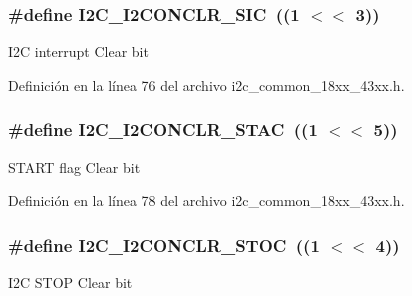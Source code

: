 \subsubsection[{\texorpdfstring{I2\+C\+\_\+\+I2\+C\+O\+N\+C\+L\+R\+\_\+\+S\+IC}{I2C_I2CONCLR_SIC}}]{\setlength{\rightskip}{0pt plus 5cm}\#define I2\+C\+\_\+\+I2\+C\+O\+N\+C\+L\+R\+\_\+\+S\+IC~((1 $<$$<$ 3))}\hypertarget{group___i2_c__18_x_x__43_x_x_ga36753112210a8c33d566b572b63b753b}{}\label{group___i2_c__18_x_x__43_x_x_ga36753112210a8c33d566b572b63b753b}
I2C interrupt Clear bit 

Definición en la línea 76 del archivo i2c\+\_\+common\+\_\+18xx\+\_\+43xx.\+h.

\subsubsection[{\texorpdfstring{I2\+C\+\_\+\+I2\+C\+O\+N\+C\+L\+R\+\_\+\+S\+T\+AC}{I2C_I2CONCLR_STAC}}]{\setlength{\rightskip}{0pt plus 5cm}\#define I2\+C\+\_\+\+I2\+C\+O\+N\+C\+L\+R\+\_\+\+S\+T\+AC~((1 $<$$<$ 5))}\hypertarget{group___i2_c__18_x_x__43_x_x_gab6148bf41d7fc32bd259d2f6a7d7667d}{}\label{group___i2_c__18_x_x__43_x_x_gab6148bf41d7fc32bd259d2f6a7d7667d}
S\+T\+A\+RT flag Clear bit 

Definición en la línea 78 del archivo i2c\+\_\+common\+\_\+18xx\+\_\+43xx.\+h.

\subsubsection[{\texorpdfstring{I2\+C\+\_\+\+I2\+C\+O\+N\+C\+L\+R\+\_\+\+S\+T\+OC}{I2C_I2CONCLR_STOC}}]{\setlength{\rightskip}{0pt plus 5cm}\#define I2\+C\+\_\+\+I2\+C\+O\+N\+C\+L\+R\+\_\+\+S\+T\+OC~((1 $<$$<$ 4))}\hypertarget{group___i2_c__18_x_x__43_x_x_ga449d7af35550484c4dfefcddd01095b8}{}\label{group___i2_c__18_x_x__43_x_x_ga449d7af35550484c4dfefcddd01095b8}
I2C S\+T\+OP Clear bit 

